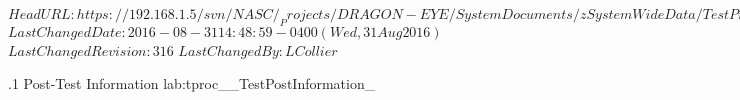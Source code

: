 \svnidlong
{$HeadURL: https://192.168.1.5/svn/NASC/_Projects/DRAGON-EYE/SystemDocuments/zSystemWideData/TestPrepProcs/TestCasePost_ConclusionInformation.tex $}
{$LastChangedDate: 2016-08-31 14:48:59 -0400 (Wed, 31 Aug 2016) $}
{$LastChangedRevision: 316 $}
{$LastChangedBy: LCollier $}

\TestProcedure%
{\TestProcNumber.1}
{\StdTestNameX Post-Test Information}
{lab:tproc_\StdTestName_TestPostInformation_\TestProcNumber}
{
}
{
}
{
}

